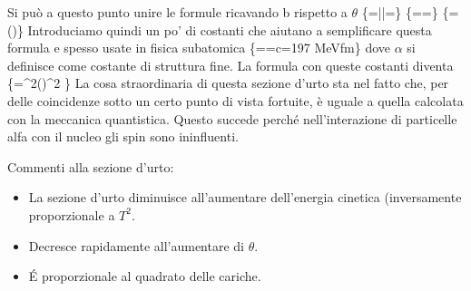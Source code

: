 Si può a questo punto unire le formule ricavando b rispetto a $\theta$ 
\{=\biggl|\biggl|=\}
\{==\}
\{=\left(\right)\}
Introduciamo quindi un po' di costanti che aiutano a semplificare questa formula e spesso usate in fisica subatomica
\{\alpha==\hspace{1cm}\hbar c=197 MeV\cdot fm\}
dove $\alpha$ si definisce come costante di struttura fine. 
La formula con queste costanti diventa
\{=\alpha^2\left(\right)^2 \}
La cosa straordinaria di questa sezione d'urto sta nel fatto che, per delle coincidenze sotto un certo punto di vista fortuite, è uguale a quella calcolata con la meccanica quantistica. Questo succede perché nell'interazione di particelle alfa con il nucleo gli spin sono ininfluenti. 

Commenti alla sezione d'urto:
\begin{itemize}
\item La sezione d'urto diminuisce all'aumentare dell'energia cinetica (inversamente proporzionale a $T^2$.
\item Decresce rapidamente all'aumentare di $\theta$.
\item \'E proporzionale al quadrato delle cariche.
\end{itemize}


